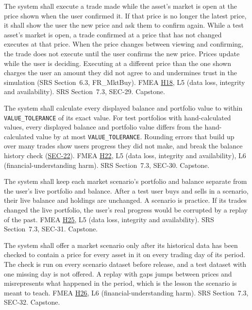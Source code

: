 \documentclass{article}
\newcommand{\reqref}[1]{\hyperref[req:#1]{#1}}
\newcommand{\hazref}[1]{\hyperref[#1]{#1}}
\begin{document}
\begin{description}
{The system shall execute a trade made while the asset's market is open at the
price shown when the user confirmed it. If that price is no longer the latest
price, it shall show the user the new price and ask them to confirm again.}
{While a test asset's market is open, a trade confirmed at a price that has
not changed executes at that price. When the price changes between viewing and
confirming, the trade does not execute until the user confirms the new price.}
{Prices update while the user is deciding. Executing at a different price than
the one shown charges the user an amount they did not agree to and undermines
trust in the simulation (SRS Section~6.3, FR\_MktBuy).}
{FMEA \hazref{H18}, L5 (data loss, integrity and availability).}
{SRS Section~7.3, SEC-29.}
{Capstone.}

{The system shall calculate every displayed balance and portfolio value to
within \texttt{VALUE\_TOLERANCE} of its exact value.}
{For test portfolios with hand-calculated values, every displayed balance and
portfolio value differs from the hand-calculated value by at most
\texttt{VALUE\_TOLERANCE}.}
{Rounding errors that build up over many trades show users progress they did
not make, and break the balance history check (\reqref{SEC-22}).}
{FMEA \hazref{H22}, L5 (data loss, integrity and availability), L6 (financial-understanding harm).}
{SRS Section~7.3, SEC-30.}
{Capstone.}

{The system shall keep each market scenario's portfolio and balance separate
from the user's live portfolio and balance.}
{After a test user buys and sells in a scenario, their live balance and
holdings are unchanged.}
{A scenario is practice. If its trades changed the live portfolio, the user's
real progress would be corrupted by a replay of the past.}
{FMEA \hazref{H25}, L5 (data loss, integrity and availability).}
{SRS Section~7.3, SEC-31.}
{Capstone.}

{The system shall offer a market scenario only after its historical data has
been checked to contain a price for every asset in it on every trading day of
its period.}
{The check is run on every scenario dataset before release, and a test dataset
with one missing day is not offered.}
{A replay with gaps jumps between prices and misrepresents what happened in the
period, which is the lesson the scenario is meant to teach.}
{FMEA \hazref{H26}, L6 (financial-understanding harm).}
{SRS Section~7.3, SEC-32.}
{Capstone.}


\end{description}
\end{document}
